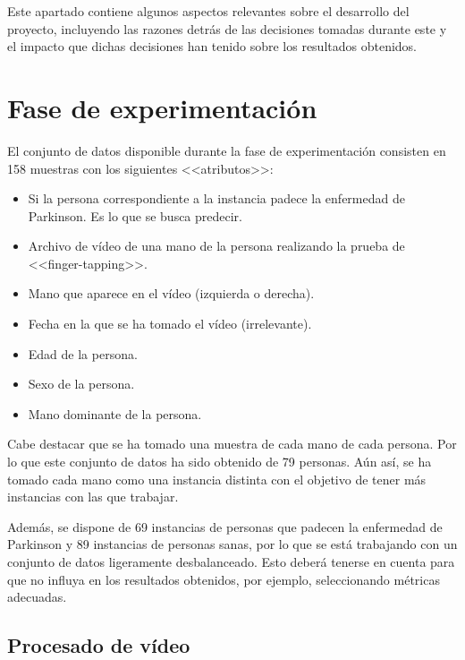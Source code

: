 \label{cha:Aspectos relevantes del desarrollo del proyecto}

Este apartado contiene algunos aspectos relevantes sobre el desarrollo del
proyecto, incluyendo las razones detrás de las decisiones tomadas durante este y
el impacto que dichas decisiones han tenido sobre los resultados obtenidos.

\section{Fase de experimentación}

El conjunto de datos disponible durante la fase de experimentación consisten en
158 muestras con los siguientes <<atributos>>:

\begin{itemize}
    \item Si la persona correspondiente a la instancia padece la enfermedad de
    Parkinson. Es lo que se busca predecir.
    \item Archivo de vídeo de una mano de la persona realizando la prueba de
    <<finger-tapping>>.
    \item Mano que aparece en el vídeo (izquierda o derecha).
    \item Fecha en la que se ha tomado el vídeo (irrelevante).
    \item Edad de la persona.
    \item Sexo de la persona.
    \item Mano dominante de la persona.
\end{itemize}

Cabe destacar que se ha tomado una muestra de cada mano de cada persona. Por lo
que este conjunto de datos ha sido obtenido de 79 personas. Aún así, se ha
tomado cada mano como una instancia distinta con el objetivo de tener más
instancias con las que trabajar.

Además, se dispone de 69 instancias de personas que padecen la enfermedad de
Parkinson y 89 instancias de personas sanas, por lo que se está trabajando con
un conjunto de datos ligeramente desbalanceado. Esto deberá tenerse en cuenta
para que no influya en los resultados obtenidos, por ejemplo, seleccionando
métricas adecuadas.

\subsection{Procesado de vídeo}

